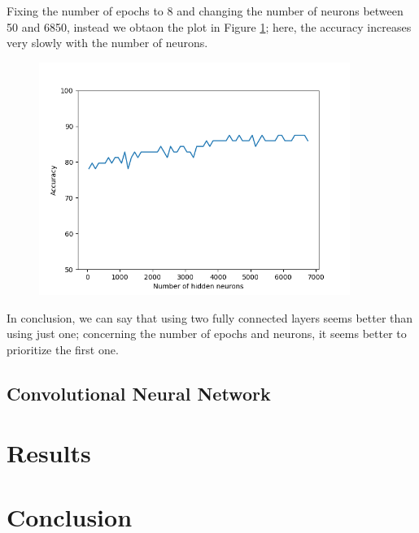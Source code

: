 \documentclass[12pt]{article}
\begin{document}
Fixing the number of epochs to 8 and changing the number of neurons between 50 and 6850, instead we obtaon the plot in Figure \ref{fig:ex3_FCNN_neurons}; here, the accuracy increases very slowly with the number of neurons.
\begin{figure}
	\centering
	\includegraphics[width = 0.9\textwidth]{ex3_FCNN2l_accuracy-neurons.png}
	\caption{}
	\label{fig:ex3_FCNN_neurons}
\end{figure}
In conclusion, we can say that using two fully connected layers seems better than using just one; concerning the number of epochs and neurons, it seems better to prioritize the first one.

\subsection{Convolutional Neural Network}


\section{Results}

\section{Conclusion}

% 
% 
\end{document}

